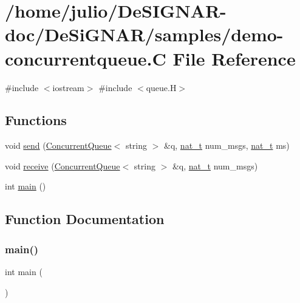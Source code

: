 \hypertarget{demo-concurrentqueue_8_c}{}\section{/home/julio/\+De\+S\+I\+G\+N\+A\+R-\/doc/\+De\+Si\+G\+N\+A\+R/samples/demo-\/concurrentqueue.C File Reference}
\label{demo-concurrentqueue_8_c}
{\ttfamily \#include $<$iostream$>$}\newline
{\ttfamily \#include $<$queue.\+H$>$}\newline
\subsection*{Functions}
\begin{DoxyCompactItemize}
\item 
void \hyperlink{demo-concurrentqueue_8_c_aa97d75998c4e7c6e867a476cb2ac4fba}{send} (\hyperlink{class_designar_1_1_concurrent_queue}{Concurrent\+Queue}$<$ string $>$ \&q, \hyperlink{namespace_designar_aa72662848b9f4815e7bf31a7cf3e33d1}{nat\+\_\+t} num\+\_\+msgs, \hyperlink{namespace_designar_aa72662848b9f4815e7bf31a7cf3e33d1}{nat\+\_\+t} ms)
\item 
void \hyperlink{demo-concurrentqueue_8_c_ab141b5e3494a69e30757648ece395552}{receive} (\hyperlink{class_designar_1_1_concurrent_queue}{Concurrent\+Queue}$<$ string $>$ \&q, \hyperlink{namespace_designar_aa72662848b9f4815e7bf31a7cf3e33d1}{nat\+\_\+t} num\+\_\+msgs)
\item 
int \hyperlink{demo-concurrentqueue_8_c_ae66f6b31b5ad750f1fe042a706a4e3d4}{main} ()
\end{DoxyCompactItemize}


\subsection{Function Documentation}
\mbox{\label{demo-concurrentqueue_8_c_ae66f6b31b5ad750f1fe042a706a4e3d4}} 
\subsubsection{\texorpdfstring{main()}{main()}}
{\footnotesize\ttfamily int main (\begin{DoxyParamCaption}{ }\end{DoxyParamCaption})}



